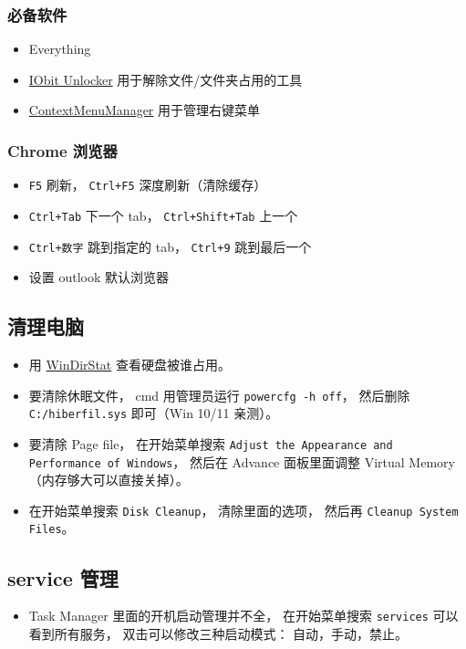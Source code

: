 \subsubsection{必备软件}
\begin{itemize}
\item Everything
\item \href{https://www.iobit.com/en/iobit-unlocker.php}{IObit Unlocker} 用于解除文件/文件夹占用的工具
\item \href{https://github.com/BluePointLilac/ContextMenuManager}{ContextMenuManager} 用于管理右键菜单
\end{itemize}

\subsubsection{Chrome 浏览器}
\begin{itemize}
\item \verb`F5` 刷新， \verb`Ctrl+F5` 深度刷新（清除缓存）
\item \verb`Ctrl+Tab` 下一个 tab， \verb`Ctrl+Shift+Tab` 上一个
\item \verb`Ctrl+数字` 跳到指定的 tab， \verb`Ctrl+9` 跳到最后一个
\item 设置 outlook 默认浏览器
\end{itemize}


\subsection{清理电脑}
\begin{itemize}
\item 用 \href{https://windirstat.net/}{WinDirStat} 查看硬盘被谁占用。
\item 要清除休眠文件， cmd 用管理员运行 \verb`powercfg -h off`， 然后删除 \verb`C:/hiberfil.sys` 即可（Win 10/11 亲测）。
\item 要清除 Page file， 在开始菜单搜索 \verb`Adjust the Appearance and Performance of Windows`， 然后在 Advance 面板里面调整 Virtual Memory（内存够大可以直接关掉）。
\item 在开始菜单搜索 \verb`Disk Cleanup`， 清除里面的选项， 然后再 \verb`Cleanup System Files`。
\end{itemize}

\subsection{service 管理}
\begin{itemize}
\item Task Manager 里面的开机启动管理并不全， 在开始菜单搜索 \verb`services` 可以看到所有服务， 双击可以修改三种启动模式： 自动，手动，禁止。
\end{itemize}

